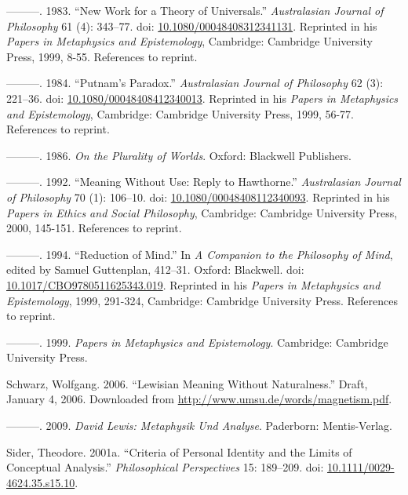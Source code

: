 \documentclass[
  11pt,
  letterpaper,
  DIV=11,
  numbers=noendperiod,
  twoside]{scrartcl}
\newlength{\cslhangindent}
\newenvironment{CSLReferences}[2] %
 {\begin{list}{}{%
  \setlength{\itemindent}{0pt}
  \setlength{\leftmargin}{0pt}
  \setlength{\parsep}{0pt}
  \ifodd #1
   \setlength{\leftmargin}{\cslhangindent}
   \setlength{\itemindent}{-1\cslhangindent}
  \fi
  \setlength{\itemsep}{#2\baselineskip}}}
 {\end{list}}
\begin{document}
\begin{CSLReferences}{1}{0}
---------. 1983. {``New Work for a Theory of Universals.''}
\emph{Australasian Journal of Philosophy} 61 (4): 343--77. doi:
\href{https://doi.org/10.1080/00048408312341131}{10.1080/00048408312341131}.
Reprinted in his \emph{Papers in Metaphysics and Epistemology},
Cambridge: Cambridge University Press, 1999, 8-55. References to
reprint.

---------. 1984. {``Putnam's Paradox.''} \emph{Australasian Journal of
Philosophy} 62 (3): 221--36. doi:
\href{https://doi.org/10.1080/00048408412340013}{10.1080/00048408412340013}.
Reprinted in his \emph{Papers in Metaphysics and Epistemology},
Cambridge: Cambridge University Press, 1999, 56-77. References to
reprint.

---------. 1986. \emph{On the Plurality of Worlds}. Oxford: Blackwell
Publishers.

---------. 1992. {``Meaning Without Use: Reply to {H}awthorne.''}
\emph{Australasian Journal of Philosophy} 70 (1): 106--10. doi:
\href{https://doi.org/10.1080/00048408112340093}{10.1080/00048408112340093}.
Reprinted in his \emph{Papers in Ethics and Social Philosophy},
Cambridge: Cambridge University Press, 2000, 145-151. References to
reprint.

---------. 1994. {``Reduction of Mind.''} In \emph{A Companion to the
Philosophy of Mind}, edited by Samuel Guttenplan, 412--31. Oxford:
Blackwell. doi:
\href{https://doi.org/10.1017/CBO9780511625343.019}{10.1017/CBO9780511625343.019}.
Reprinted in his \emph{Papers in Metaphysics and Epistemology}, 1999,
291-324, Cambridge: Cambridge University Press. References to reprint.

---------. 1999. \emph{Papers in Metaphysics and Epistemology}.
Cambridge: Cambridge University Press.

Schwarz, Wolfgang. 2006. {``Lewisian Meaning Without Naturalness.''}
Draft, January 4, 2006. Downloaded from
\url{http://www.umsu.de/words/magnetism.pdf}.

---------. 2009. \emph{David Lewis: Metaphysik Und Analyse}. Paderborn:
Mentis-Verlag.

Sider, Theodore. 2001a. {``Criteria of Personal Identity and the Limits
of Conceptual Analysis.''} \emph{Philosophical Perspectives} 15:
189--209. doi:
\href{https://doi.org/10.1111/0029-4624.35.s15.10}{10.1111/0029-4624.35.s15.10}.


\end{CSLReferences}
\end{document}
